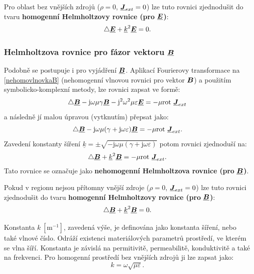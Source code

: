 \documentclass[12pt,a4paper,oneside]{article}
\numberwithin{equation}{section} %
\numberwithin{figure}{section} %
\numberwithin{table}{section} %
\newcommand{\mj}{\mathrm{j}} %
\renewcommand{\vec}[1]{\mbox{\boldmath$#1$}} %
\newcommand{\faz}[1]{{\underline{#1}}} %
\newcommand{\rot}{\mathrm{rot}\ }
\begin{document}
Pro oblast bez vnějších zdrojů ($\rho = 0$, $\faz{\vec{J}} _{ext} = 0$) lze tuto rovnici zjednodušit do tvaru \textbf{homogenní Helmholtzovy rovnice (pro} $\faz{\vec{E}}$\textbf{)}:
\begin{equation}
\label{homohelmholtze}
\triangle \faz{\vec{E}} + \faz{k} ^2 \faz{\vec{E}} = 0 .
\end{equation}

\subsubsection*{Helmholtzova rovnice pro fázor vektoru $\faz{\vec{B}}$}
Podobně se postupuje i pro vyjádření $\faz{\vec{B}}$. Aplikací Fourierovy transformace na \ref{nehomovlnovkaB} (nehomogenní vlnovou rovnici pro vektor $\vec{B}$) a použitím symbolicko-komplexní metody, lze rovnici zapsat ve formě:
\begin{equation}
\triangle \faz{\vec{B}} - \mj \omega \mu \gamma \faz{\vec{B}} - \mj ^2 \omega ^2 \mu \varepsilon \faz{\vec{E}} = - \mu \rot \faz{\vec{J}} _{ext}
\end{equation}
a následně jí malou úpravou (vytknutím) přepsat jako:
\begin{equation}
\triangle \faz{\vec{B}} - \mj \omega \mu (\gamma + \mj \omega \varepsilon) \faz{\vec{B}} = - \mu \rot \faz{\vec{J}} _{ext} .
\end{equation}
Zavedení konstanty šíření $\faz{k} = \pm \sqrt{- \mj \omega \mu (\gamma + \mj \omega \varepsilon)}$ potom rovnici zjednoduší na:
\begin{equation}
\triangle \faz{\vec{B}} + \faz{k} ^2 \faz{\vec{B}} = - \mu \rot \faz{\vec{J}} _{ext} .
\end{equation}
Tato rovnice se označuje jako \textbf{nehomogenní Helmholtzova rovnice (pro} $\faz{\vec{B}}$\textbf{)}.

Pokud v regionu nejsou přítomny vnější zdroje ($\rho = 0$, $\faz{\vec{J}} _{ext} = 0$) lze tuto rovnici zjednodušit do tvaru \textbf{homogenní Helmholtzovy rovnice (pro} $\faz{\vec{B}}$\textbf{)}:
\begin{equation}
\label{homohelmholtzb}
\triangle \faz{\vec{B}} + \faz{k} ^2 \faz{\vec{B}} = 0 .
\end{equation}

Konstanta $k ~\mathrm{[m ^{-1}]}$, zavedená výše, je definována jako konstanta šíření, nebo také  vlnové číslo. Odráží existenci materiálových parametrů prostředí, ve kterém se vlna šíří. Konstanta je závislá na permitivitě, permeabilitě, konduktivitě a také na frekvenci. Pro homogenní prostředí bez vnějších zdrojů ji lze zapsat jako:
\begin{equation}
k = \omega \sqrt{\mu \varepsilon} .
\end{equation}
\end{document}

